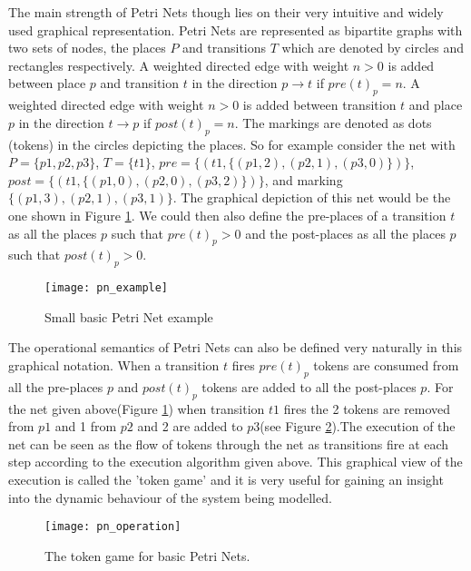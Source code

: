 The main strength of Petri Nets though lies on their very intuitive and widely used graphical representation. Petri Nets are represented as bipartite graphs with two sets of nodes, the places $P$ and transitions $T$ which are denoted by circles and rectangles respectively. A weighted directed edge with weight $n>0$ is added between place $p$ and transition $t$ in the direction $p\rightarrow t$ if $pre(t)_p=n$. A weighted directed edge with weight $n>0$ is added between transition $t$ and place $p$ in the direction $t\rightarrow p$ if $post(t)_p=n$. The markings are denoted as dots (tokens) in the circles depicting the places. So for example consider the net with $P=\{p1, p2, p3\}$, $T=\{t1\}$, $pre=\{(t1, \{(p1, 2), (p2, 1), (p3, 0)\})\}$, $post=\{(t1, \{(p1, 0), (p2, 0), (p3, 2)\})\}$, and marking $\{(p1, 3), (p2, 1), (p3, 1)\}$. The graphical depiction of this net would be the one shown in Figure \ref{fig:pn_example}. We could then also define the pre-places of a transition $t$ as all the places $p$ such that $pre(t)_p >0 $ and the post-places as all the places $p$ such that $post(t)_p >0 $.

\begin{figure}
\centering
\texttt{[image: pn\_example]}
\caption{Small basic Petri Net example}
\label{fig:pn_example}
\end{figure}

The operational semantics of Petri Nets can also be defined very naturally in this graphical notation. When a transition $t$ fires $pre(t)_p$ tokens are consumed from all the pre-places $p$ and $post(t)_p$ tokens are added to all the post-places $p$. For the net given above(Figure \ref{fig:pn_example}) when transition $t1$ fires the 2 tokens are removed from $p1$ and 1 from $p2$ and 2 are added to $p3$(see Figure \ref{fig:pn_operation}).The execution of the net can be seen as the flow of tokens through the net as transitions fire at each step according to the execution algorithm given above. This graphical view of the execution is called the 'token game' and it is very useful for gaining an insight into the dynamic behaviour of the system being modelled.
\begin{figure}
\centering
\texttt{[image: pn\_operation]}
\caption{The token game for basic Petri Nets.}
\label{fig:pn_operation}
\end{figure}

